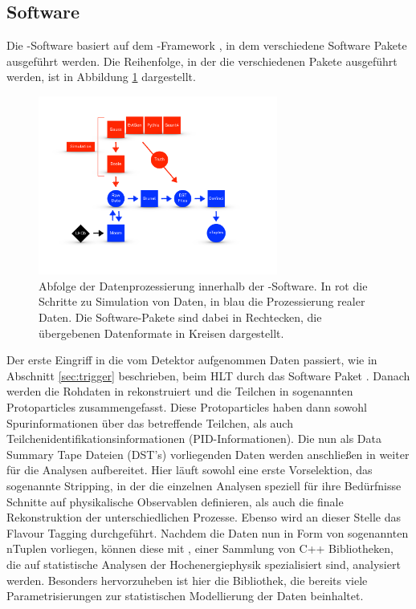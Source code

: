 \subsection{\lhcb Software}

Die \lhcb-Software basiert auf dem \gaudi-Framework \cite{gaudi}, in dem verschiedene Software Pakete ausgeführt werden. Die Reihenfolge, in der die verschiedenen Pakete ausgeführt werden, ist in Abbildung \ref{fig:software} dargestellt.
\begin{figure}[htpb]
	\centering
		\includegraphics[width=0.7\textwidth]{fig/software.pdf}
	\caption{Abfolge der Datenprozessierung innerhalb der \lhcb-Software. In rot die Schritte zu Simulation von Daten, in blau die Prozessierung realer Daten. Die Software-Pakete sind dabei in Rechtecken, die übergebenen Datenformate in Kreisen dargestellt.}
	\label{fig:software} 
\end{figure}
Der erste Eingriff in die vom Detektor aufgenommen Daten passiert, wie in Abschnitt \ref{sec:trigger} beschrieben, beim HLT durch das Software Paket \moore \cite{moore}. Danach werden die Rohdaten in \brunel \cite{brunel} rekonstruiert und die Teilchen in sogenannten Protoparticles zusammengefasst. Diese Protoparticles haben dann sowohl Spurinformationen über das betreffende Teilchen, als auch Teilchenidentifikationsinformationen (PID-Informationen). Die nun als Data Summary Tape Dateien (DST's) vorliegenden Daten werden anschließen in \davinci \cite{davinci} weiter für die Analysen aufbereitet. Hier läuft sowohl eine erste Vorselektion, das sogenannte Stripping, in der die einzelnen Analysen speziell für ihre Bedürfnisse Schnitte auf physikalische Observablen definieren, als auch die finale Rekonstruktion der unterschiedlichen Prozesse. Ebenso wird an dieser Stelle das Flavour Tagging durchgeführt. Nachdem die Daten nun in Form von sogenannten nTuplen vorliegen, können diese mit \root \cite{root}, einer Sammlung von C++ Bibliotheken, die auf statistische Analysen der Hochenergiephysik spezialisiert sind, analysiert werden. Besonders hervorzuheben ist hier die \roofit \cite{roofit} Bibliothek, die bereits viele Parametrisierungen zur statistischen Modellierung der Daten beinhaltet. \\

